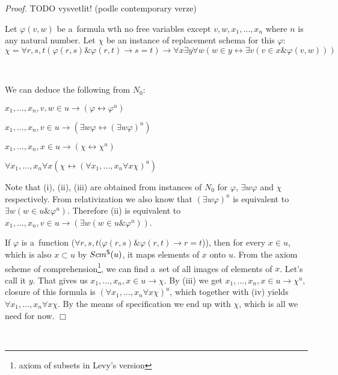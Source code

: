 \documentclass[12pt,a4paper]{article}
\newenvironment{proof}
{\noindent \textit{Proof.}}
{\hspace*{\fill} $\Box$}
\renewcommand{\iff}{\leftrightarrow}
\newcommand{\then}{\rightarrow}
\newcommand{\bce}{\begin{compactenum}}
\newcommand{\ece}{\end{compactenum}}
\begin{document}
\begin{proof}
TODO vysvetlit! (podle contemporary verze)

Let $\varphi(v, w)$ be a~formula wth no free variables except $v, w, x_1, \ldots, x_n$ where $n$ is any natural number.
Let $\chi$ be an instance of replacement schema for this $\varphi$:
\begin{equation}
\chi = \forall r, s, t(\varphi(r, s) \& \varphi(r, t) \then s = t) \then \forall x \exists y \forall w (w \in y \iff \exists v (v \in x \& \varphi(v, w)))
\end{equation}

\

We can deduce the following from $N_0$: 
\bce[(i)]
\item $x_1, \ldots, x_n, v, w \in u \then (\varphi \iff \varphi^{u}) $
\item $x_1, \ldots, x_n, v \in u \then (\exists w \varphi \iff (\exists w \varphi)^{u})$
\item $x_1, \ldots, x_n, x \in u \then (\chi \iff \chi^{u})$
\item $\forall x_1, \ldots, x_n \forall x (\chi \iff (\forall x_1, \ldots, x_n \forall x \chi)^{u})$
\ece

Note that (i), (ii), (iii) are obtained from instances of $N_0$ for $\varphi$, $\exists w \varphi$ and $\chi$ respectively.  %
From relativization we also know that $(\exists w \varphi)^{u}$ is equivalent to $\exists w (w \in u \& \varphi^{u})$.
Therefore (ii) is equivalent to $x_1, \ldots, x_n, v \in u \then (\exists w (w \in u \& \varphi^{u}))$. 

If $\varphi$ is a~function ($ \forall r, s, t(\varphi(r, s) \& \varphi(r, t) \then r=t $)), then for every $x \in u$, which is also $x \subset u$ by $Scm^{\sf{S}}(u)$,
it maps elements of $x$ onto $u$. From the axiom scheme of comprehension\footnote{axiom of subsets in Levy's version}, we can find a~set of all images of elements of $x$. Let's call it $y$.
That gives us $x_1, \ldots, x_n, x \in u \then \chi$. By (iii) we get $x_1, \ldots, x_n, x \in u \then \chi^{u}$, closure of this formula is $(\forall x_1, \ldots, x_n \forall x \chi)^{u}$, 
which together with (iv) yields $\forall x_1, \ldots, x_n \forall x \chi$. By the means of specification we end up with $\chi$, which is all we need for now. 
\end{proof}

\

\end{document}
